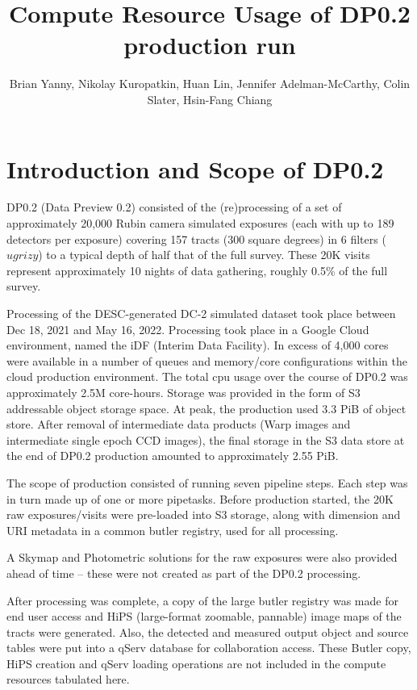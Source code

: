 \documentclass[OPS,authoryear,toc]{lsstdoc}
\title{Compute Resource Usage of DP0.2 production run}
\author{%
Brian Yanny, Nikolay Kuropatkin, Huan Lin, Jennifer Adelman-McCarthy, Colin Slater, Hsin-Fang Chiang
}
\date{\vcsDate}
\begin{document}
\maketitle


\section{Introduction and Scope of DP0.2}

DP0.2 (Data Preview 0.2) consisted of the (re)processing of a 
set of approximately 20,000 Rubin camera simulated exposures (each with up to
189 detectors per exposure) covering 157 tracts 
(300 square degrees) in 6 filters ($ugrizy$) to a typical 
depth of half that of the full survey.  These 20K visits represent 
approximately 10 nights of data gathering, roughly 0.5\% of the 
full survey.

Processing of the DESC-generated DC-2 simulated dataset \citep{DESC} took place between Dec 18, 2021 and May 16, 2022.  Processing took place in a Google Cloud environment, named the iDF (Interim Data Facility).  In excess of 4,000 cores
were available in a number of queues and memory/core configurations
within the cloud production environment.  The total cpu usage over the 
course of DP0.2 was approximately 2.5M core-hours. Storage was provided 
in the form of S3 addressable object storage space.  At peak, the production 
used 3.3 PiB of object store. After removal of intermediate data products
(Warp images and intermediate single epoch CCD images), the final storage
in the S3 data store at the end of DP0.2 production amounted to approximately
2.55 PiB. 

The scope of production consisted of running seven pipeline steps. Each step
was in turn made up of one or more pipetasks.   Before production
started, the 20K raw exposures/visits were pre-loaded into S3 storage, along
with dimension and URI metadata in a common butler registry, 
used for all processing.  

A Skymap and Photometric solutions for the 
raw exposures were also provided ahead of time -- these were not created
as part of the DP0.2 processing.

After processing was complete, a copy of the large butler registry was made
for end user access and HiPS (large-format zoomable, pannable) image maps 
of the tracts were generated. Also, the detected and measured output object 
and source tables were put into a qServ database for collaboration
access.  These Butler copy, HiPS creation and qServ loading operations
are not included in the compute resources tabulated here. 
\end{document}
